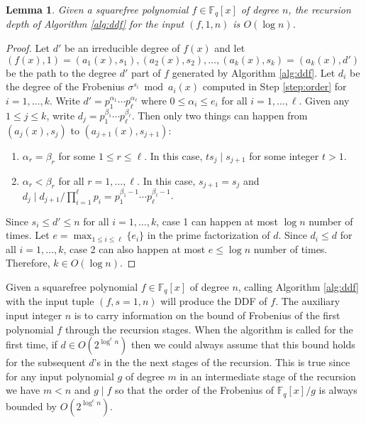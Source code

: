 \documentclass{article}
\theoremstyle{plain}
\newtheorem{lemma}[theorem]{Lemma}
\theoremstyle{definition}
\def\F{\ensuremath{\mathbb{F}}}
\begin{document}
\begin{lemma}
	\label{lem:depth}
	Given a squarefree polynomial $f \in \F_q[x]$ of degree $n$, the recursion depth of Algorithm 
	\ref{alg:ddf} for the input $(f, 1, n)$ is $O(\log n)$.
\end{lemma}
\begin{proof}
	Let $d'$ be an irreducible degree of $f(x)$ and let $(f(x), 1) = (a_1(x), s_1), (a_2(x), s_2), 
	\dots, (a_k(x), s_k) = (a_k(x), d')$ be the path to the degree $d'$ part of $f$ generated by 
	Algorithm \ref{alg:ddf}. Let $d_i$ be the degree of the Frobenius $\sigma^{s_i} \bmod a_i(x)$ 
	computed in Step \ref{step:order} for $i = 1, \dots, k$. Write $d' = p_1^{\alpha_1} \cdots 
	p_\ell^{\alpha_\ell}$ where $0 \le \alpha_i \le e_i$ for all $i = 1, \dots, \ell$. Given any 
	$1 \le j \le k$, write $d_j = p_1^{\beta_1} \cdots p_\ell^{\beta_\ell}$. Then only two things 
	can happen from $(a_j(x), s_j)$ to $(a_{j + 1}(x), s_{j + 1})$:
	\begin{enumerate}
		\item $\alpha_r = \beta_r$ for some $1 \le r \le \ell$. In this case, $ts_j \mid s_{j + 1}$ 
		for some integer $t > 1$.
		\item $\alpha_r < \beta_r$ for all $r = 1, \dots, \ell$. In this case, $s_{j + 1} = s_j$ 
		and $d_j \mid d_{j + 1} / \prod_{i = 1}^\ell p_i = p_1^{\beta_1 - 1} \cdots 
		p_\ell^{\beta_\ell - 1}$.
	\end{enumerate}
	Since $s_i \le d' \le n$ for all $i = 1, \dots, k$, case 1 can happen at most $\log n$ 
	number of times. Let $e = \max_{1 \le i \le \ell}\{ e_i \}$ in the prime factorization of $d$. 
	Since $d_i \le d$ for all $i = 1, \dots, k$, case 2 can also happen at most $e \le \log n$ 
	number of times. Therefore, $k \in O(\log n)$.
\end{proof}
Given a squarefree polynomial $f \in \F_q[x]$ of degree $n$, calling Algorithm \ref{alg:ddf} with 
the input tuple $(f, s = 1, n)$ will produce the DDF of $f$. The auxiliary input integer $n$ is to 
carry information on the bound of Frobenius of the first polynomial $f$ through the recursion 
stages. When the algorithm is called for the first time, if $d \in O(2^{\log^cn})$ then we 
could always assume that this bound holds for the subsequent $d$'s in the the next stages of the 
recursion. This is true since for any input polynomial $g$ of degree $m$ in an intermediate stage 
of the recursion we have $m < n$ and $g \mid f$ so that the order of the Frobenius of $\F_q[x] / g$ 
is always bounded by $O(2^{\log^cn})$. 
\end{document}
